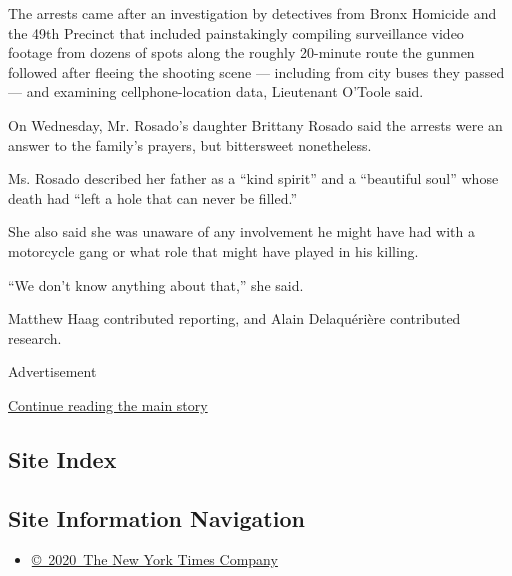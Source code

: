 The arrests came after an investigation by detectives from Bronx
Homicide and the 49th Precinct that included painstakingly compiling
surveillance video footage from dozens of spots along the roughly
20-minute route the gunmen followed after fleeing the shooting scene ---
including from city buses they passed --- and examining
cellphone-location data, Lieutenant O'Toole said.

On Wednesday, Mr. Rosado's daughter Brittany Rosado said the arrests
were an answer to the family's prayers, but bittersweet nonetheless.

Ms. Rosado described her father as a ``kind spirit'' and a ``beautiful
soul'' whose death had ``left a hole that can never be filled.''

She also said she was unaware of any involvement he might have had with
a motorcycle gang or what role that might have played in his killing.

``We don't know anything about that,'' she said.

Matthew Haag contributed reporting, and Alain Delaquérière contributed
research.

Advertisement

\protect\hyperlink{after-bottom}{Continue reading the main story}

\hypertarget{site-index}{%
\subsection{Site Index}\label{site-index}}

\hypertarget{site-information-navigation}{%
\subsection{Site Information
Navigation}\label{site-information-navigation}}

\begin{itemize}
\tightlist
\item
  \href{https://help.nytimes3xbfgragh.onion/hc/en-us/articles/115014792127-Copyright-notice}{©~2020~The
  New York Times Company}
\end{itemize}

